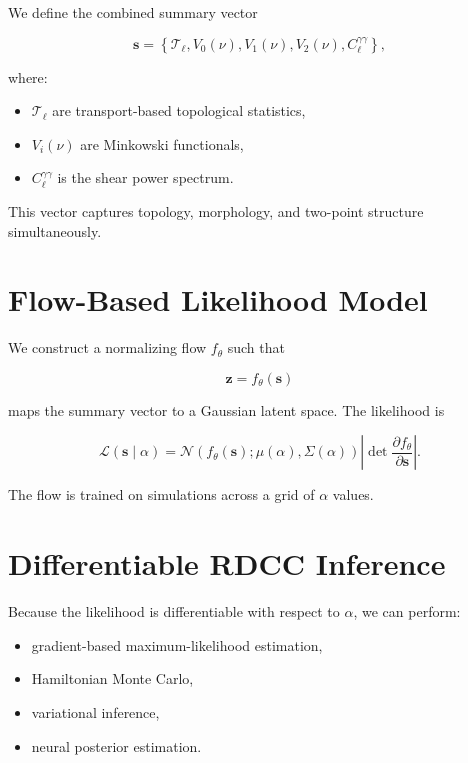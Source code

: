 \documentclass[11pt,a4paper]{article}
\begin{document}
We define the combined summary vector



\[
    \mathbf{s}
    =
    \left\{
        \mathcal{T}_{\ell},
        V_{0}(\nu),
        V_{1}(\nu),
        V_{2}(\nu),
        C_{\ell}^{\gamma\gamma}
    \right\},
\]



where:

\begin{itemize}
    \item $\mathcal{T}_{\ell}$ are transport-based topological statistics,
    \item $V_{i}(\nu)$ are Minkowski functionals,
    \item $C_{\ell}^{\gamma\gamma}$ is the shear power spectrum.
\end{itemize}

This vector captures topology, morphology, and two-point structure simultaneously.
\section{Flow-Based Likelihood Model}

We construct a normalizing flow $f_{\theta}$ such that



\[
    \mathbf{z} = f_{\theta}(\mathbf{s})
\]



maps the summary vector to a Gaussian latent space. The likelihood is



\[
    \mathcal{L}(\mathbf{s} \mid \alpha)
    =
    \mathcal{N}\!\left(
        f_{\theta}(\mathbf{s});
        \mu(\alpha),
        \Sigma(\alpha)
    \right)
    \left|
        \det \frac{\partial f_{\theta}}{\partial \mathbf{s}}
    \right|.
\]



The flow is trained on simulations across a grid of $\alpha$ values.
\section{Differentiable RDCC Inference}

Because the likelihood is differentiable with respect to $\alpha$, we can perform:

\begin{itemize}
    \item gradient-based maximum-likelihood estimation,
    \item Hamiltonian Monte Carlo,
    \item variational inference,
    \item neural posterior estimation.
\end{itemize}
\end{document}
